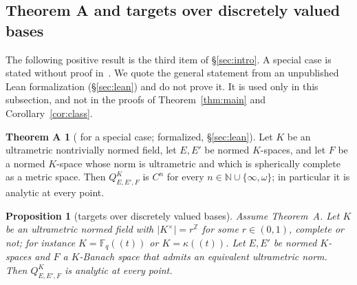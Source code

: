 \documentclass[11pt]{amsart}
\newtheorem{proposition}[theorem]{Proposition}
\theoremstyle{definition}
\newtheorem*{thmA}{Theorem A}
\theoremstyle{remark}
\numberwithin{equation}{section}
\newcommand{\N}{\mathbb{N}}
\newcommand{\Z}{\mathbb{Z}}
\newcommand{\F}{\mathbb{F}}
\newcommand{\abs}[1]{\lvert #1\rvert}
\begin{document}
\subsection*{Theorem A and targets over discretely valued bases}
The following positive result is the third item of \S\ref{sec:intro}. A special case is stated without proof
in~\cite[Remark~16]{M}. We quote the general statement from an unpublished Lean formalization (\S\ref{sec:lean}) and
do not prove it. It is used only in this subsection, and not in the proofs of Theorem~\ref{thm:main} and Corollary~\ref{cor:class}.

\begin{thmA}[{\cite[Remark~16]{M}} for a special case; formalized, \S\ref{sec:lean}]
Let $K$ be an ultrametric nontrivially normed field, let $E,E'$ be normed $K$\nobreakdash-spaces, and let $F$ be a normed $K$\nobreakdash-space
whose norm is ultrametric and which is spherically complete as a metric space. Then $Q^K_{E,E',F}$ is $C^n$ for every
$n\in\N\cup\{\infty,\omega\}$; in particular it is analytic at every point.
\end{thmA}

\begin{proposition}[targets over discretely valued bases]\label{prop:discrete}
Assume Theorem~A. Let $K$ be an ultrametric normed field with $\abs{K^\times}=r^\Z$ for some $r\in(0,1)$, complete or
not; for instance $K=\F_q((t))$ or $K=\kappa((t))$. Let $E,E'$ be normed $K$\nobreakdash-spaces and $F$ a $K$\nobreakdash-Banach space that
admits an equivalent ultrametric norm. Then $Q^K_{E,E',F}$ is analytic at every point.
\end{proposition}
\end{document}
